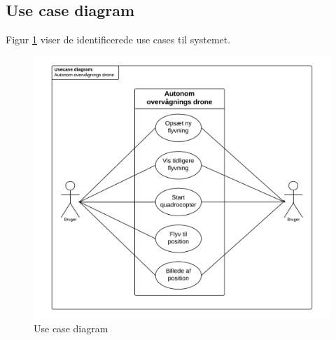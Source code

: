 \newpage 

\subsection{Use case diagram}
\label{subsec:useCaseDiagram}
Figur \ref{fig:UCD} viser de identificerede use cases til systemet.
\vspace{-10pt}
\begin{figure}[H]
\includegraphics[width=1\textwidth]{Billeder/Use_case_diagram.png}
\vspace{-30pt}
\caption{Use case diagram}
\label{fig:UCD}
\end{figure}